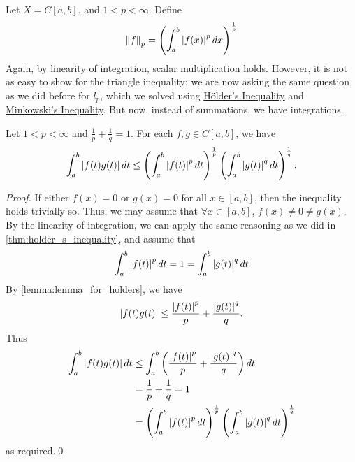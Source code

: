 \documentclass[notoc,notitlepage]{tufte-book}
\newcommand{\norm}[1]{\left\| #1 \right\|}
\begin{document}
\begin{eg}
  Let $X = C[a, b]$, and $1 < p < \infty$. Define
  \begin{equation*}
    \norm{f}_p = \left( \int_{a}^{b} \abs{f(x)}^p \dif{x} \right)^{\frac{1}{p}}
  \end{equation*}
  Again, by linearity of integration, scalar multiplication holds. However, it is not as easy to show for the triangle inequality; we are now asking the same question as we did before for $l_p$, which we solved using \hyperref[thm:holder_s_inequality]{H\"{o}lder's Inequality} and \hyperref[thm:minkowshi_s_inequality]{Minkowski's Inequality}. But now, instead of summations, we have integrations.
\end{eg}

\begin{thm}
\label{thm:holder_s_inequality_v2}
  Let $1 < p < \infty$ and $\frac{1}{p} + \frac{1}{q} = 1$. For each $f, g \in C[a, b]$, we have
  \begin{equation*}
    \int_{a}^{b} \left|f(t)g(t)\right| \mathop{}\!d{t} \leq \left( \int_{a}^{b} \left|f(t)\right|^p \mathop{}\!d{t} \right)^\frac{1}{p} \left( \int_{a}^{b} \left|g(t)\right|^q \mathop{}\!d{t} \right)^\frac{1}{q}.
  \end{equation*}
\end{thm}

\begin{proof}
  If either $f(x) = 0$ or $g(x) = 0$ for all $x \in [a, b]$, then the inequality holds trivially so. Thus, we may assume that $\forall x \in [a, b]$, $f(x) \neq 0 \neq g(x)$. By the linearity of integration, we can apply the same reasoning as we did in \cref{thm:holder_s_inequality}, and assume that
  \begin{equation*}
    \int_{a}^{b} \left|f(t)\right|^p \mathop{}\!d{t} = 1 = \int_{a}^{b} \left|g(t)\right|^q \mathop{}\!d{t} 
  \end{equation*}
  By \cref{lemma:lemma_for_holders}, we have
  \begin{equation*}
    \left|f(t) g(t)\right| \leq \frac{\left|f(t)\right|^p}{p} + \frac{\left|g(t)\right|^q}{q}.
  \end{equation*}
  Thus
  \begin{align*}
    \int_{a}^{b} \left|f(t) g(t)\right| \mathop{}\!d{t} &\leq \int_{a}^{b} \left( \frac{\left|f(t)\right|^p}{p} + \frac{\left|g(t)\right|^q}{q} \right) \mathop{}\!d{t} \\
                                         &= \frac{1}{p} + \frac{1}{q} = 1 \\
                                         &= \left( \int_{a}^{b} \left|f(t)\right|^p \mathop{}\!d{t} \right)^\frac{1}{p} \left( \int_{a}^{b} \left|g(t)\right|^q \mathop{}\!d{t} \right)^\frac{1}{q}
  \end{align*}
  as required.\qed
\end{proof}
\end{document}
